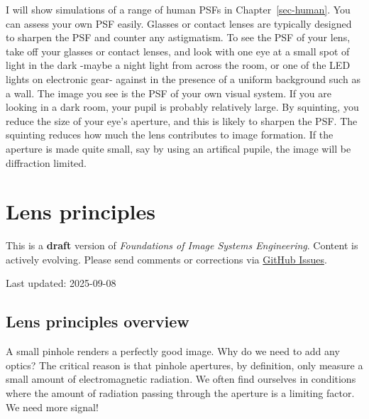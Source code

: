 \documentclass[
  letterpaper,
]{book}
\begin{document}
I will show simulations of a range of human PSFs in
Chapter~\ref{sec-human}. You can assess your own PSF easily. Glasses or
contact lenses are typically designed to sharpen the PSF and counter any
astigmatism. To see the PSF of your lens, take off your glasses or
contact lenses, and look with one eye at a small spot of light in the
dark -maybe a night light from across the room, or one of the LED lights
on electronic gear- against in the presence of a uniform background such
as a wall. The image you see is the PSF of your own visual system. If
you are looking in a dark room, your pupil is probably relatively large.
By squinting, you reduce the size of your eye's aperture, and this is
likely to sharpen the PSF. The squinting reduces how much the lens
contributes to image formation. If the aperture is made quite small, say
by using an artifical pupile, the image will be diffraction limited.

\chapter{Lens principles}\label{sec-optics-lenses}

\begin{tcolorbox}[enhanced jigsaw, opacityback=0, breakable, coltitle=black, leftrule=.75mm, left=2mm, colframe=quarto-callout-warning-color-frame, opacitybacktitle=0.6, bottomtitle=1mm, bottomrule=.15mm, toprule=.15mm, title=\textcolor{quarto-callout-warning-color}{\faExclamationTriangle}\hspace{0.5em}{Work in Progress}, titlerule=0mm, toptitle=1mm, colback=white, rightrule=.15mm, colbacktitle=quarto-callout-warning-color!10!white, arc=.35mm]

This is a \textbf{draft} version of \emph{Foundations of Image Systems
Engineering}. Content is actively evolving. Please send comments or
corrections via \href{https://github.com/wandell/FISE-git/issues}{GitHub
Issues}.

Last updated: 2025-09-08

\end{tcolorbox}

\section{Lens principles overview}\label{sec-optics-lenses-overview}

A small pinhole renders a perfectly good image. Why do we need to add
any optics? The critical reason is that pinhole apertures, by
definition, only measure a small amount of electromagnetic radiation. We
often find ourselves in conditions where the amount of radiation passing
through the aperture is a limiting factor. We need more signal!
\end{document}
